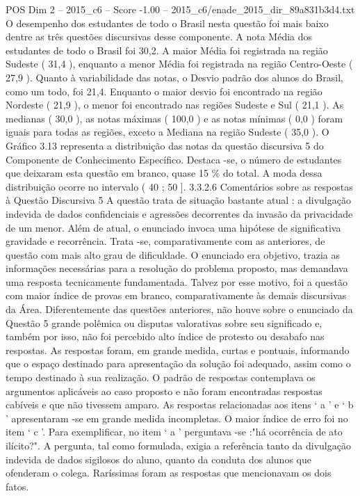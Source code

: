 \begin{textsample}{POS Dim 2 – 2015\_c6 – Score -1.00 – 2015\_c6/enade\_2015\_dir\_89a831b3d4.txt}
O desempenho dos estudantes de todo o Brasil nesta questão foi mais baixo dentre as três questões discursivas desse componente.
A nota Média dos estudantes de todo o Brasil foi 30,2.
A maior Média foi registrada na região Sudeste ( 31,4 ), enquanto a menor Média foi registrada na região Centro-Oeste ( 27,9 ).
Quanto à variabilidade das notas, o Desvio padrão dos alunos do Brasil, como um todo, foi 21,4.
Enquanto o maior desvio foi encontrado na região Nordeste ( 21,9 ), o menor foi encontrado nas regiões Sudeste e Sul ( 21,1 ).
As medianas ( 30,0 ), as notas máximas ( 100,0 ) e as notas mínimas ( 0,0 ) foram iguais para todas as regiões, exceto a Mediana na região Sudeste ( 35,0 ).
O Gráfico 3.13 representa a distribuição das notas da questão discursiva 5 do Componente de Conhecimento Específico.
Destaca -se, o número de estudantes que deixaram esta questão em branco, quase 15 \% do total.
A moda dessa distribuição ocorre no intervalo ( 40 ; 50 ]. 3.3.2.6 Comentários sobre as respostas à Questão Discursiva 5 A questão trata de situação bastante atual : a divulgação indevida de dados confidenciais e agressões decorrentes da invasão da privacidade de um menor.
Além de atual, o enunciado invoca uma hipótese de significativa gravidade e recorrência.
Trata -se, comparativamente com as anteriores, de questão com mais alto grau de dificuldade.
O enunciado era objetivo, trazia as informações necessárias para a resolução do problema proposto, mas demandava uma resposta tecnicamente fundamentada.
Talvez por esse motivo, foi a questão com maior índice de provas em branco, comparativamente às demais discursivas da Área.
Diferentemente das questões anteriores, não houve sobre o enunciado da Questão 5 grande polêmica ou disputas valorativas sobre seu significado e, também por isso, não foi percebido alto índice de protesto ou desabafo nas respostas.
As respostas foram, em grande medida, curtas e pontuais, informando que o espaço destinado para apresentação da solução foi adequado, assim como o tempo destinado à sua realização.
O padrão de respostas contemplava os argumentos aplicáveis ao caso proposto e não foram encontradas respostas cabíveis e que não tivessem amparo.
As respostas relacionadas aos itens ‘ a ’ e ‘ b ’ apresentaram -se em grande medida incompletas.
O maior índice de erro foi no item ‘ c ’.
Para exemplificar, no item ‘ a ’ perguntava -se :"há ocorrência de ato ilícito?".
A pergunta, tal como formulada, exigia a referência tanto da divulgação indevida de dados sigilosos do aluno, quanto da conduta dos alunos que ofenderam o colega.
Raríssimas foram as respostas que mencionavam os dois fatos.

\end{textsample}
